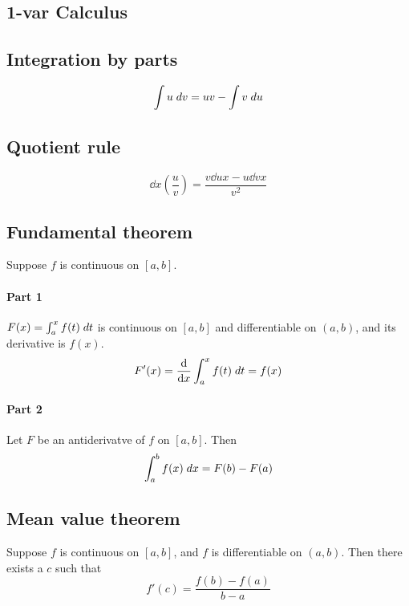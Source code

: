 \documentclass[a4paper]{article}
\begin{document}
\begin{multicols*}{3}
  \section*{1-var Calculus}
    \subsection*{Integration by parts}
      \begin{equation*}
        \int u \; dv = uv - \int v \; du
      \end{equation*}
    \subsection*{Quotient rule}
      \begin{equation*}
        \dd{}{x} \left( \dfrac{u}{v} \right)
        = \dfrac{v \dd{u}{x} - u \dd{v}{x}}{v^2}
      \end{equation*}
    \subsection*{Fundamental theorem}
      Suppose $f$ is continuous on $[a, b]$.
      \paragraph{Part 1}
        $F(x) = \int_{a}^{x} f(t) \; dt$ is continuous on $[a,b]$ and differentiable on $(a,b)$, and its derivative is $f(x)$.
        \begin{equation*}
          F'(x) = \dfrac{\mathrm{d}}{\mathrm{d}x} \int_{a}^{x} f(t) \; dt = f(x)
        \end{equation*}
      \paragraph{Part 2}
        Let $F$ be an antiderivatve of $f$ on $[a,b]$. Then
        \begin{equation*}
          \int_{a}^{b} f(x) \; dx = F(b) - F(a)
        \end{equation*}
    \subsection*{Mean value theorem}
      Suppose $f$ is continuous on $[a,b]$, and $f$ is differentiable on $(a,b)$. Then there exists a $c$ such that
      \begin{equation*}
        f'(c) = \dfrac{f(b)-f(a)}{b-a}
      \end{equation*}

\end{multicols*}
\end{document}
